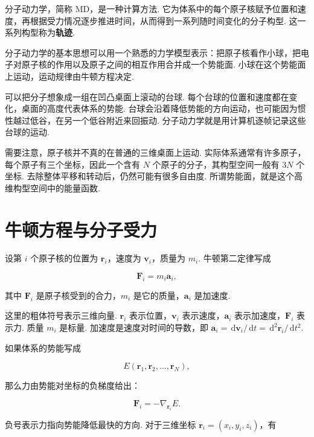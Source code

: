 \documentclass[UTF8,11pt,a4paper,openany]{ctexbook}
\newcommand{\dd}{\,\mathrm d}\newcommand{\Ham}{\hat H}\newcommand{\tr}{\operatorname{Tr}}
\newcommand{\term}[1]{\textbf{#1}}
\begin{document}
\begin{definitionbox}
分子动力学，简称 MD，是一种计算方法. 它为体系中的每个原子核赋予位置和速度，再根据受力情况逐步推进时间，从而得到一系列随时间变化的分子构型. 这一系列构型称为\term{轨迹}. 
\end{definitionbox}

分子动力学的基本思想可以用一个熟悉的力学模型表示：把原子核看作小球，把电子对原子核的作用以及原子之间的相互作用合并成一个势能面. 小球在这个势能面上运动，运动规律由牛顿方程决定. 

\begin{analogybox}
可以把分子想象成一组在凹凸桌面上滚动的台球. 每个台球的位置和速度都在变化，桌面的高度代表体系的势能. 台球会沿着降低势能的方向运动，也可能因为惯性越过低谷，在另一个低谷附近来回振动. 分子动力学就是用计算机逐帧记录这些台球的运动. 
\end{analogybox}

需要注意，原子核并不真的在普通的三维桌面上运动. 实际体系通常有许多原子，每个原子有三个坐标，因此一个含有 $N$ 个原子的分子，其构型空间一般有 $3N$ 个坐标. 去除整体平移和转动后，仍然可能有很多自由度. 所谓势能面，就是这个高维构型空间中的能量函数. 

\section{牛顿方程与分子受力}

设第 $i$ 个原子核的位置为 $\mathbf r_i$，速度为 $\mathbf v_i$，质量为 $m_i$. 牛顿第二定律写成

\[
\mathbf F_i=m_i\mathbf a_i,
\]

其中 $\mathbf F_i$ 是原子核受到的合力，$m_i$ 是它的质量，$\mathbf a_i$ 是加速度. 

\begin{notationbox}
这里的粗体符号表示三维向量. $\mathbf r_i$ 表示位置，$\mathbf v_i$ 表示速度，$\mathbf a_i$ 表示加速度，$\mathbf F_i$ 表示力. 质量 $m_i$ 是标量. 加速度是速度对时间的导数，即 $\mathbf a_i=\dd\mathbf v_i/\dd t=\dd^2\mathbf r_i/\dd t^2$. 
\end{notationbox}

如果体系的势能写成

\[
E(\mathbf r_1,\mathbf r_2,\ldots,\mathbf r_N),
\]

那么力由势能对坐标的负梯度给出：

\[
\mathbf F_i=-\nabla_{\mathbf r_i}E.
\]

负号表示力指向势能降低最快的方向. 对于三维坐标 $\mathbf r_i=(x_i,y_i,z_i)$，有
\end{document}
